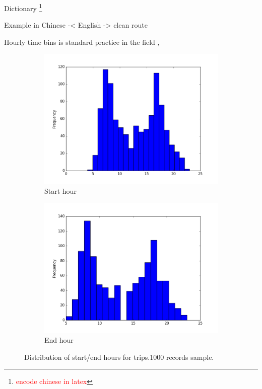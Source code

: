 \documentclass{article}
\newcommand{\selfnote}[1]{\footnote{\textcolor{red}{#1}}}
\begin{document}
Dictionary \selfnote{encode chinese in latex}

Example in Chinese -< English -> clean route

Hourly time bins is standard practice in the field \cite{langlois2016inferring} \cite{ma2017understanding}, 

\begin{figure}[H]
  \centering
  \begin{subfigure}[b]{.45\textwidth}
  	\centering
  	\includegraphics[width=\linewidth]{./images/start_hour_hist.png}
  	\caption{Start hour}
  \end{subfigure}
  \begin{subfigure}[b]{.45\textwidth}
  	\centering
  	\includegraphics[width=\linewidth]{./images/end_hour_hist.png}
  	\caption{End hour}
  \end{subfigure}
  \caption{Distribution of start/end hours for trips.1000 records sample.}
  	\label{fig:preprocessing/start_end_hour}
\end{figure}
\end{document}
